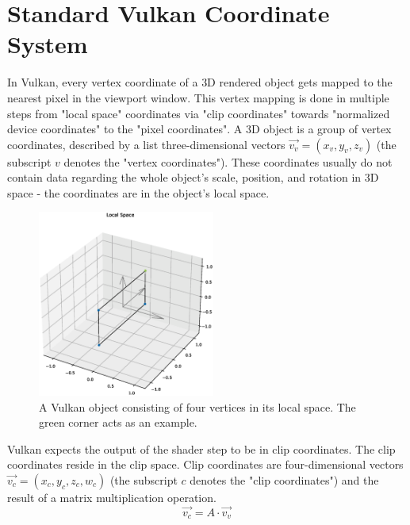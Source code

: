 \section{Standard Vulkan Coordinate System}
\label{sec:VulkanCoords}
In Vulkan, every vertex coordinate of a 3D rendered object gets mapped to the nearest pixel in the viewport window. This vertex mapping is done in multiple steps from "local space" coordinates via "clip coordinates" towards "normalized device coordinates" to the "pixel coordinates".
A 3D object is a group of vertex coordinates, described by a list three-dimensional vectors $\vec{v_{v}} = (x_{v},y_{v},z_{v})$ (the subscript $v$ denotes the "vertex coordinates"). These coordinates usually do not contain data regarding the whole object's scale, position, and rotation in 3D space - the coordinates are in the object's local space.
\begin{figure}[H]
    \centering
    \includegraphics[width=0.52\textwidth]{images/Vulkan_local_space.eps}
    \caption{A Vulkan object consisting of four vertices in its local space. The green corner acts as an example.}
    \label{im:VulkanLocalSpace}
\end{figure}
Vulkan expects the output of the shader step to be in clip coordinates. The clip coordinates reside in the clip space. Clip coordinates are four-dimensional vectors $\overrightarrow{v_{c}} = (x_{c},y_{c},z_{c},w_{c})$ (the subscript $c$ denotes the "clip coordinates") and the result of a matrix multiplication operation.\\
\begin{equation*}
    \vec{v_{c}} = A \cdot  \vec{v_{v}}
\end{equation*}
